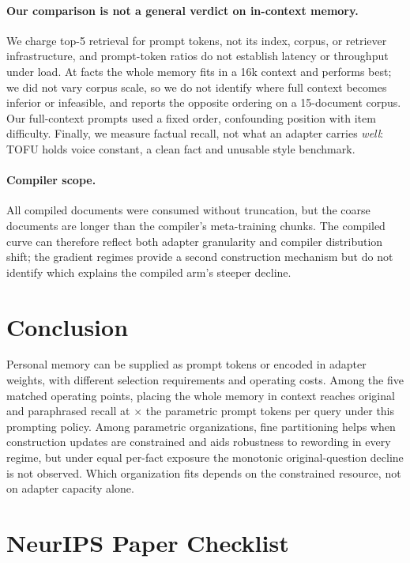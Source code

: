 \documentclass{article}
\begin{document}
\paragraph{Our comparison is not a general verdict on in-context memory.} We
charge top-5 retrieval for prompt tokens, not its index, corpus, or retriever
infrastructure, and prompt-token ratios do not establish latency or throughput
under load. At \NPerArm{} facts the whole memory fits in a 16k context and performs
best; we did not vary corpus scale, so we do not identify where full context becomes
inferior or infeasible, and \citet{dataquality} reports the opposite ordering on a
15-document corpus. Our full-context prompts used a fixed order, confounding
position with item difficulty. Finally, we measure factual recall, not what
an adapter carries \emph{well}: TOFU holds voice constant, a clean fact and
unusable style benchmark.

\paragraph{Compiler scope.} All compiled documents were consumed without
truncation, but the coarse documents are longer than the compiler's
meta-training chunks. The compiled curve can therefore reflect both adapter
granularity and compiler distribution shift; the gradient regimes provide a
second construction mechanism but do not identify which explains the compiled
arm's steeper decline.

\section{Conclusion}

Personal memory can be supplied as prompt tokens or encoded in adapter weights,
with different selection requirements and operating costs. Among the five matched
operating points, placing the whole memory in context reaches \FullCtxQ{} original
and \FullCtxPQ{} paraphrased recall at \FullCtxRatio{}$\times$ the parametric
prompt tokens per query under this prompting policy. Among parametric
organizations, fine partitioning helps when construction updates are constrained
and aids robustness to rewording in every regime, but under equal per-fact
exposure the monotonic original-question decline is not observed. Which
organization fits depends on the constrained resource, not on adapter capacity
alone.




\newpage
\section*{NeurIPS Paper Checklist}

\end{document}

